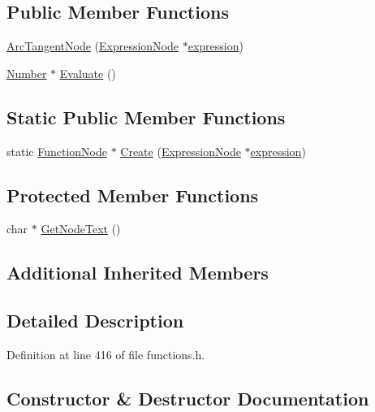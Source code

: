 \subsection*{Public Member Functions}
\begin{DoxyCompactItemize}
\item 
\hyperlink{classArcTangentNode_a2b174bed5fa2e62b858ce79654e7bb3c}{Arc\+Tangent\+Node} (\hyperlink{classExpressionNode}{Expression\+Node} $\ast$\hyperlink{classFunctionNode_ad7577b179a1937aaf8a0058bb5b546dc}{expression})
\item 
\hyperlink{structNumber}{Number} $\ast$ \hyperlink{classArcTangentNode_a61ce03a435f72dde99caba3547a0a2a8}{Evaluate} ()
\end{DoxyCompactItemize}
\subsection*{Static Public Member Functions}
\begin{DoxyCompactItemize}
\item 
static \hyperlink{classFunctionNode}{Function\+Node} $\ast$ \hyperlink{classArcTangentNode_a39aefe24ffd196b99a8c110619e5db2b}{Create} (\hyperlink{classExpressionNode}{Expression\+Node} $\ast$\hyperlink{classFunctionNode_ad7577b179a1937aaf8a0058bb5b546dc}{expression})
\end{DoxyCompactItemize}
\subsection*{Protected Member Functions}
\begin{DoxyCompactItemize}
\item 
char $\ast$ \hyperlink{classArcTangentNode_afd1b56cd9bf1c3a3da5191bf9604881d}{Get\+Node\+Text} ()
\end{DoxyCompactItemize}
\subsection*{Additional Inherited Members}


\subsection{Detailed Description}


Definition at line 416 of file functions.\+h.



\subsection{Constructor \& Destructor Documentation}
